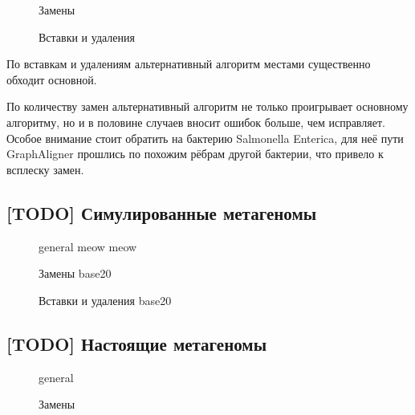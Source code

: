 \documentclass[14pt]{matmex-diploma-custom}
\begin{document}
\begin{figure}[h]
    \centering
    
    \caption{Замены}
    \label{fig:mismatches_mix}
\end{figure}

\begin{figure}[h]
    \centering
    
    \caption{Вставки и удаления}
    \label{fig:indels_mix}
\end{figure}

По вставкам и удалениям альтернативный алгоритм местами существенно обходит основной.

По количеству замен альтернативный алгоритм не только проигрывает основному алгоритму, но и в половине случаев вносит ошибок больше, чем исправляет. Особое внимание стоит обратить на бактерию Salmonella Enterica, для неё пути GraphAligner прошлись по похожим рёбрам другой бактерии, что привело к всплеску замен.


\subsection{[TODO] Симулированные метагеномы}
\begin{figure}[h]
    
    \caption{general meow meow}
    \label{fig:general_base20}
\end{figure}

\begin{figure}[h]
    \centering
    
    \caption{Замены base20}
    \label{fig:mismatches_base20}
\end{figure}

\begin{figure}[h]
    \centering
    
    \caption{Вставки и удаления base20}
    \label{fig:indels_base20}
\end{figure}

\subsection{[TODO] Настоящие метагеномы}
\begin{figure}[h]
    \centering
    
    \caption{general}
    \label{fig:general_bmock12}
\end{figure}

\begin{figure}[h]
    \centering
    
    \caption{Замены}
    \label{fig:mismatches_bmock12}
\end{figure}
\end{document}
